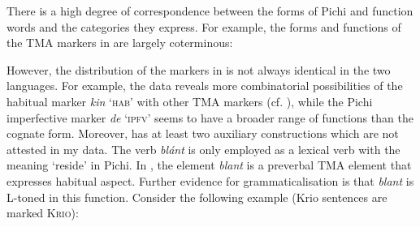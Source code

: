 There is a high degree of correspondence between the forms of Pichi and  function words and the categories they express. For example, the forms and functions of the TMA markers in  are largely coterminous: 

However, the distribution of the markers in  is not always identical in the two languages. For example, the  data reveals more combinatorial possibilities of the habitual marker \textit{kin} ‘\textsc{hab}’ with other TMA markers (cf. \citealt{Dandeson2001}), while the Pichi imperfective marker  \textit{de} ‘\textsc{ipfv}’ seems to have a broader range of functions than the  cognate form. Moreover,  has at least two auxiliary constructions which are not attested in my data. The verb \textit{blánt} is only employed as a lexical verb with the meaning ‘reside’ in Pichi. In , the element \textit{blant} is a preverbal TMA element that expresses habitual aspect. Further evidence for grammaticalisation is that \textit{blant} is L-toned in this function. Consider the following example (Krio sentences are marked \textsc{Krio}):

